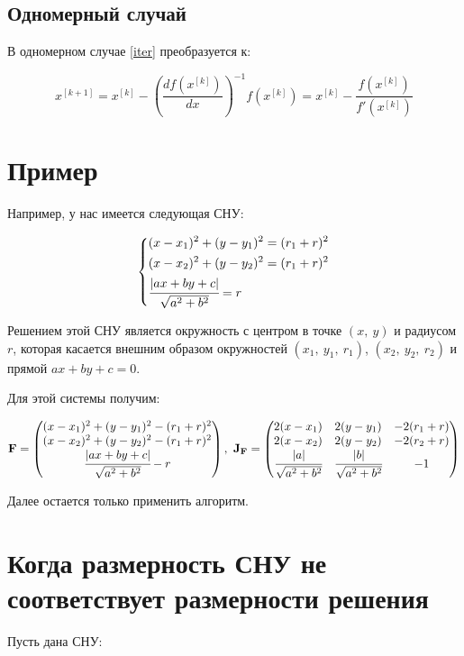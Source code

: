 \documentclass[12pt, a4paper]{article}
\newcommand{\roubr}[1]{\left(#1\right)}
\begin{document}
\subsection{Одномерный случай}

В одномерном случае \eqref{iter} преобразуется к:

$$ x^{[k+1]} = x^{[k]} - \roubr{\frac{d f\roubr{x^{[k]}}}{dx}}^{-1} f\roubr{x^{[k]}} = x^{[k]} - \frac{f\roubr{x^{[k]}}}{f'\roubr{x^{[k]}}} $$

\section{Пример}

Например, у нас имеется следующая СНУ:

$$\left\{
\begin{aligned}
	&(x-x_1)^2 + (y-y_1)^2 = (r_1 + r)^2 \\
	&(x-x_2)^2 + (y-y_2)^2 = (r_1 + r)^2 \\
	&\cfrac{|ax + by + c|}{\sqrt{a^2 + b^2}} = r
\end{aligned}
\right.
$$

Решением этой СНУ является окружность с центром в точке $(x,\ y)$ и радиусом $r$, которая касается внешним образом окружностей $(x_1,\ y_1,\ r_1)$, $(x_2,\ y_2,\ r_2)$ и прямой $ax + by + c = 0$.

Для этой системы получим:

$$
\mathbf{F} = \begin{pmatrix}
	(x-x_1)^2 + (y-y_1)^2 - (r_1 + r)^2 \\
	(x-x_2)^2 + (y-y_2)^2 - (r_1 + r)^2 \\
	\cfrac{|ax + by + c|}{\sqrt{a^2 + b^2}} - r
\end{pmatrix},\
\mathbf{J}_\mathbf{F} = \begin{pmatrix}
	2(x-x_1) & 2(y-y_1) & -2(r_1 + r) \\
	2(x-x_2) & 2(y-y_2) & -2(r_2 + r) \\
	\cfrac{|a|}{\sqrt{a^2 + b^2}} & \cfrac{|b|}{\sqrt{a^2 + b^2}} & -1
\end{pmatrix}
$$

Далее остается только применить алгоритм.

\section{Когда размерность СНУ не соответствует размерности решения}

Пусть дана СНУ:
\end{document}
